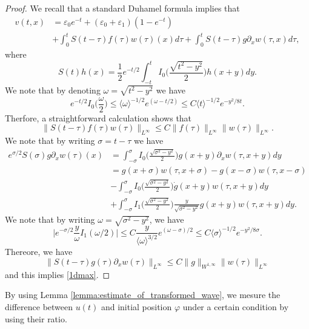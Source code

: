 \documentclass[reqno]{amsart}
\begin{document}
\begin{proof}
We recall that a standard Duhamel formula implies that
	\begin{align*}
	v(t,x)
	&= \varepsilon_0 e^{-t}
	+ ( \varepsilon_0 + \varepsilon_1 )(1-e^{-t})\\
	&+ \int_0^t S(t-\tau) f(\tau) w(\tau)(x) d\tau
	+ \int_0^t S(t-\tau) g \partial_x w(\tau,x) d\tau,
	\end{align*}
where
	\[
	S(t) h(x)
	= \frac{1}{2} e^{-t/2} \int_{-t}^{t} I_0 \bigg( \frac{\sqrt{t^2-y^2}}{2} \bigg) h(x+y) d y.
	\]
We note that by denoting $\omega = \sqrt{t^2-y^2}$ we have
	\[
	e^{-t/2} I_0 \bigg( \frac{\omega}{2} \bigg)
	\leq \langle \omega \rangle^{-1/2} e^{(\omega - t/2)}
	\leq C \langle t \rangle^{-1/2} e^{-y^2/8t}.
	\]
Therfore, a straightforward calculation shows that
	\[
	\| S(t-\tau) f(\tau) w(\tau) \|_{L^\infty}
	\leq C \| f(\tau) \|_{L^\infty} \| w(\tau) \|_{L^\infty}.
	\]
We note that by writing $\sigma = t-\tau$ we have
	\begin{align*}
	e^{\sigma/2} S(\sigma) g \partial_x w(\tau)(x)
	&= \int_{-\sigma}^{\sigma} I_0 \bigg( \frac{\sqrt{\sigma^2-y^2}}{2} \bigg) g(x+y) \partial_x w(\tau, x+y) dy\\
	&= g(x+\sigma) w(\tau,x+\sigma) - g(x-\sigma) w(\tau,x-\sigma)\\
	&- \int_{-\sigma}^{\sigma} I_0 \bigg( \frac{\sqrt{\sigma^2-y^2}}{2} \bigg) \dot g(x+y) w(\tau,x+y) dy\\
	&+ \int_{-\sigma}^{\sigma} I_1 \bigg( \frac{\sqrt{\sigma^2-y^2}}{2} \bigg) \frac{y}{\sqrt{\sigma^2-y^2}} g(x+y) w(\tau,x+y) dy.
	\end{align*}
We note that by writing $\omega = \sqrt{\sigma^2-y^2}$,
we have
	\[
	\bigg| e^{-\sigma/2} \frac{y}{\omega} I_1(\omega/2) \bigg|
	\leq C \frac{y}{\langle \omega \rangle^{3/2}} e^{(\omega - \sigma)/2}
	\leq C \langle \sigma \rangle^{-1/2} e^{-y^2/8\sigma}.
	\]
Thereore, we have
	\[
	\| S(t-\tau) g(\tau) \partial_x w(\tau) \|_{L^\infty}
	\leq C \| g \|_{W^{1,\infty}} \| w(\tau) \|_{L^\infty}
	\]
and this implies \eqref{1dmax}.
\end{proof}

By using Lemma \ref{lemma:estimate_of_transformed_wave},
we mesure the difference between $u(t)$ and initial position $\varphi$
under a certain condition by using their ratio.
\end{document}

